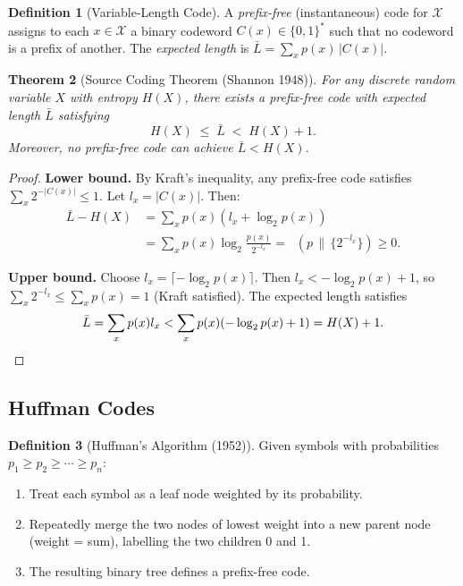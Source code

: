 \documentclass[12pt,a4paper]{amsart}
\newtheorem{theorem}{Theorem}[section]
\theoremstyle{definition}
\newtheorem{definition}[theorem]{Definition}
\theoremstyle{remark}
\DeclareMathOperator{\KL}{D_{KL}}
\begin{document}
\begin{definition}[Variable-Length Code]
A \emph{prefix-free} (instantaneous) code for $\mathcal{X}$ assigns to each
$x \in \mathcal{X}$ a binary codeword $C(x) \in \{0,1\}^*$ such that no codeword
is a prefix of another. The \emph{expected length} is
$\bar{L} = \sum_x p(x)\,|C(x)|$.
\end{definition}

\begin{theorem}[Source Coding Theorem (Shannon 1948)]\label{thm:source-coding}
For any discrete random variable $X$ with entropy $H(X)$, there exists a
prefix-free code with expected length $\bar{L}$ satisfying
\[
  H(X) \;\leq\; \bar{L} \;<\; H(X) + 1.
\]
Moreover, no prefix-free code can achieve $\bar{L} < H(X)$.
\end{theorem}
\begin{proof}
\textbf{Lower bound.} By Kraft's inequality, any prefix-free code satisfies
$\sum_x 2^{-|C(x)|} \leq 1$. Let $l_x = |C(x)|$. Then:
\begin{align*}
  \bar{L} - H(X) &= \sum_x p(x)(l_x + \log_2 p(x)) \\
  &= \sum_x p(x)\log_2\frac{p(x)}{2^{-l_x}}
   = \KL\!\left(p \,\Big\|\, \{2^{-l_x}\}\right) \geq 0.
\end{align*}

\textbf{Upper bound.} Choose $l_x = \lceil -\log_2 p(x)\rceil$. Then
$l_x < -\log_2 p(x) + 1$, so $\sum_x 2^{-l_x} \leq \sum_x p(x) = 1$ (Kraft
satisfied). The expected length satisfies
\[
  \bar{L} = \sum_x p(x)l_x < \sum_x p(x)(-\log_2 p(x) + 1) = H(X) + 1. \qedhere
\]
\end{proof}

\subsection{Huffman Codes}

\begin{definition}[Huffman's Algorithm (1952)]
Given symbols with probabilities $p_1 \geq p_2 \geq \cdots \geq p_n$:
\begin{enumerate}
  \item Treat each symbol as a leaf node weighted by its probability.
  \item Repeatedly merge the two nodes of lowest weight into a new parent node
        (weight = sum), labelling the two children 0 and 1.
  \item The resulting binary tree defines a prefix-free code.
\end{enumerate}
\end{definition}
\end{document}
